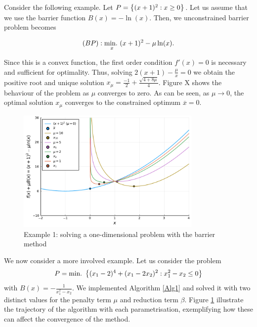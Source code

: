 Consider the following example. Let $P = \left\{ (x+1)^2 : x \ge 0 \right \}$. Let us assume that we use the barrier function $B(x) = -\ln(x)$. Then, we unconstrained barrier problem becomes

\begin{equation}
 (BP): \mathop{\text{min.~}}_x (x+1)^2 - \mu \ln(x).	
\end{equation}

Since this is a convex function, the first order condition $f'(x) = 0$ is necessary and sufficient for optimality. Thus, solving $2(x+1) - \frac{\mu}{x} = 0$ we obtain the positive root and unique solution $x_\mu=\frac{-1}{2} + \frac{\sqrt{4 + 8\mu}}{4}$. Figure X shows the behaviour of the problem as $\mu$ converges to zero. As can be seen, as $\mu \rightarrow 0$, the optimal solution $x_\mu$ converges to the constrained optimum $\overline{x} = 0$.

\begin{figure}
	\includegraphics[width=0.8\textwidth]{part_2/chapter_10/figures/ex2-barrier.pdf}
	\caption{Example 1: solving a one-dimensional problem with the barrier method} \label{fig:figure_2}
\end{figure}  

We now consider a more involved example. Let us consider the problem 
$$
	P = \mathop{\text{min.~}}\left\{ (x_1-2)^4 + (x_1-2x_2)^2 : x_1^2 - x_2 \leq 0 \right \}
$$ 
with $B(x) = -\frac{1}{x_1^2 - x_2}$. We implemented Algorithm \ref{Alg1} and solved it with two distinct values for the penalty term $\mu$ and reduction term $\beta$. Figure \ref{fig:figure_2} illustrate the trajectory of the algorithm with each parametrisation, exemplifying how these can affect the convergence of the method.

